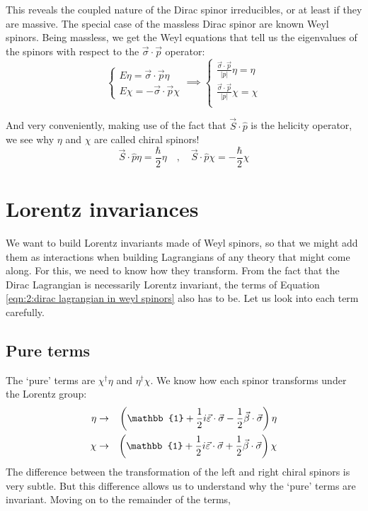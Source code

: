 This reveals the coupled nature of the Dirac spinor irreducibles, or at least if they are massive. The special case of the massless Dirac spinor are known Weyl spinors. Being massless, we get the Weyl equations that tell us the eigenvalues of the spinors with respect to the $\Vec{\sigma}\cdot\Vec{p}$ operator:
\begin{equation}
    \begin{cases}
        E \eta = \Vec{\sigma} \cdot \Vec{p} \eta\\
        E \chi = - \Vec{\sigma} \cdot \Vec{p} \chi
    \end{cases}
    \implies
    \begin{cases}
        \frac{\Vec{\sigma}\cdot\Vec{p}}{\vert p \vert} \eta = \eta\\
        \frac{\Vec{\sigma}\cdot\Vec{p}}{\vert p \vert} \chi = \chi\\
    \end{cases}
    \label{eqn:2:weyl equations}
\end{equation}

And very conveniently, making use of the fact that $\Vec{S}\cdot\hat{p}$ is the helicity operator, we see why $\eta$ and $\chi$ are called chiral spinors!
\begin{equation}
    \Vec{S} \cdot \hat{p} \eta = \frac{\hbar}{2} \eta
    \quad , \quad 
    \Vec{S} \cdot \hat{p} \chi = - \frac{\hbar}{2} \chi
    \label{eqn:2:helical spinors}
\end{equation}

\section{Lorentz invariances}
\label{ch:2:lorentz invariances}
We want to build Lorentz invariants made of Weyl spinors, so that we might add them as interactions when building Lagrangians of any theory that might come along. For this, we need to know how they transform. From the fact that the Dirac Lagrangian is necessarily Lorentz invariant, the terms of Equation \ref{eqn:2:dirac lagrangian in weyl spinors} also has to be. Let us look into each term carefully.

\subsection{Pure terms}
\label{ch:2:lorentz invariances:pure terms}
The `pure' terms are $\chi^\dagger\eta$ and $\eta^\dagger\chi$. We know how each spinor transforms under the Lorentz group:
\begin{eqnarray}
    \eta &\rightarrow& \lc\mathbb{1} + \frac{1}{2} i \Vec{\varepsilon}\cdot\Vec{\sigma} - \frac{1}{2} \Vec{\beta}\cdot\Vec{\sigma}\rc \eta
    \label{eqn:2:right chiral transformation} \\
    \chi &\rightarrow& \lc\mathbb{1} + \frac{1}{2} i \Vec{\varepsilon}\cdot\Vec{\sigma} + \frac{1}{2} \Vec{\beta}\cdot\Vec{\sigma}\rc \chi 
    \label{eqn:2:left chiral transformation}
\end{eqnarray}
The difference between the transformation of the left and right chiral spinors is very subtle. But this difference allows us to understand why the `pure' terms are invariant. Moving on to the remainder of the terms,

